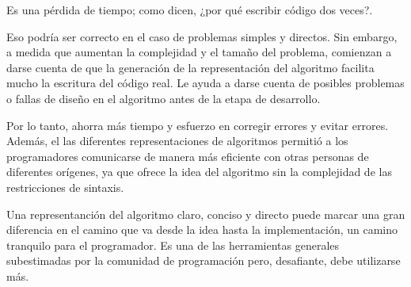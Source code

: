 Es una pérdida de tiempo; como dicen, ¿por qué escribir código dos veces?.

Eso podría ser correcto en el caso de problemas simples y directos. Sin embargo, a medida que aumentan la complejidad y el tamaño del problema, comienzan a darse cuenta de que la generación de la representación del algoritmo facilita mucho la escritura del código real. Le ayuda a darse cuenta de posibles problemas o fallas de diseño en el algoritmo antes de la etapa de desarrollo.

Por lo tanto, ahorra más tiempo y esfuerzo en corregir errores y evitar errores. Además, el las diferentes representaciones de algoritmos permitió a los programadores comunicarse de manera más eficiente con otras personas de diferentes orígenes, ya que ofrece la idea del algoritmo sin la complejidad de las restricciones de sintaxis.

Una representanción del algoritmo claro, conciso y directo puede marcar una gran diferencia en el camino que va desde la idea hasta la implementación, un camino tranquilo para el programador. Es una de las herramientas generales subestimadas por la comunidad de programación pero, desafiante, debe utilizarse más.